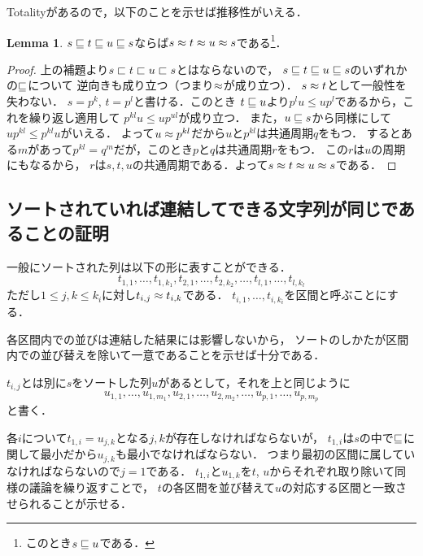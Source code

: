\documentclass{scrartcl}
\theoremstyle{definition}
\newtheorem{lemma}{Lemma}
\begin{document}
Totalityがあるので，以下のことを示せば推移性がいえる．
\begin{lemma}
  $s \sqsubseteq t \sqsubseteq u \sqsubseteq s$ならば$s \approx t \approx u \approx s$である\footnote{%
    このとき$s \sqsubseteq u$である．}．
\end{lemma}
\begin{proof}
  上の補題より$s \sqsubset t \sqsubset u \sqsubset s$とはならないので，
  $s \sqsubseteq t \sqsubseteq u \sqsubseteq s$のいずれかの$\sqsubseteq$について
  逆向きも成り立つ（つまり$\approx$が成り立つ）．
  $s \approx t$として一般性を失わない．
  $s = p^k$, $t = p^l$と書ける．このとき
  $t \sqsubseteq u$より$p^l u \le u p^l$であるから，これを繰り返し適用して
  $p^{kl}u \le u p^{ul}$が成り立つ．
  また，$u \sqsubseteq s$から同様にして$u p^{kl} \le p^{kl} u$がいえる．
  よって$u \approx p^{kl}$だから$u$と$p^{kl}$は共通周期$q$をもつ．
  するとある$m$があって$p^{kl} = q^m$だが，このとき$p$と$q$は共通周期$r$をもつ．
  この$r$は$u$の周期にもなるから，
  $r$は$s, t, u$の共通周期である．よって$s \approx t \approx u \approx s$である．
\end{proof}


\subsection{ソートされていれば連結してできる文字列が同じであることの証明}

一般にソートされた列は以下の形に表すことができる．
\begin{displaymath}
  t_{1,1}, \dots, t_{1,k_1}, t_{2,1}, \dots, t_{2, k_2}, \dots,
  t_{l,1}, \dots, t_{l, k_l}
\end{displaymath}
ただし$1 \le j, k \le k_i$に対し$t_{i,j} \approx t_{i,k}$である．
$t_{i,1},\dots,t_{i,k_i}$を区間と呼ぶことにする．

各区間内での並びは連結した結果には影響しないから，
ソートのしかたが区間内での並び替えを除いて一意であることを示せば十分である．

$t_{i,j}$とは別に$s$をソートした列$u$があるとして，それを上と同じように
\begin{displaymath}
  u_{1,1}, \dots, u_{1,m_1}, u_{2,1}, \dots, u_{2, m_2}, \dots,
  u_{p,1}, \dots, u_{p,m_p}
\end{displaymath}
と書く．

各$i$について$t_{1,i} = u_{j,k}$となる$j,k$が存在しなければならないが，
$t_{1,i}$は$s$の中で$\sqsubseteq$に関して最小だから$u_{j,k}$も最小でなければならない．
つまり最初の区間に属していなければならないので$j=1$である．
$t_{1,i}$と$u_{1,k}$を$t$, $u$からそれぞれ取り除いて同様の議論を繰り返すことで，
$t$の各区間を並び替えて$u$の対応する区間と一致させられることが示せる．
\end{document}
